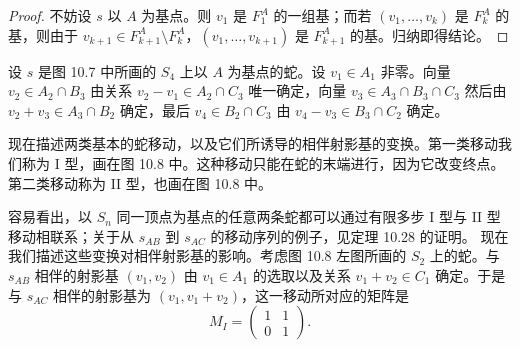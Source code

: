 \begin{proof}
不妨设 $s$ 以 $A$ 为基点。则 $v_1$ 是 $F^A_1$ 的一组基；而若 $(v_1,\dots,v_k)$ 是 $F^A_k$ 的基，则由于 $v_{k+1}\in F^A_{k+1}\setminus F^A_k$，$(v_1,\dots,v_{k+1})$ 是 $F^A_{k+1}$ 的基。归纳即得结论。
\end{proof}

\begin{example}[10.27] 设 $s$ 是图 10.7 中所画的 $S_4$ 上以 $A$ 为基点的蛇。设 $v_1\in A_1$ 非零。向量 $v_2\in A_2\cap B_3$ 由关系 $v_2-v_1\in A_2\cap C_3$ 唯一确定，向量 $v_3\in A_3\cap B_3\cap C_3$ 然后由 $v_2+v_3\in A_3\cap B_2$ 确定，最后 $v_4\in B_2\cap C_3$ 由 $v_4-v_3\in B_3\cap C_2$ 确定。
\end{example}


现在描述两类基本的蛇移动，以及它们所诱导的相伴射影基的变换。第一类移动我们称为 I 型，画在图 10.8 中。这种移动只能在蛇的末端进行，因为它改变终点。第二类移动称为 II 型，也画在图 10.8 中。


容易看出，以 $S_n$ 同一顶点为基点的任意两条蛇都可以通过有限多步 I 型与 II 型移动相联系；关于从 $s_{AB}$ 到 $s_{AC}$ 的移动序列的例子，见定理 10.28 的证明。
现在我们描述这些变换对相伴射影基的影响。考虑图 10.8 左图所画的 $S_2$ 上的蛇。与 $s_{AB}$ 相伴的射影基 $(v_1,v_2)$ 由 $v_1\in A_1$ 的选取以及关系 $v_1+v_2\in C_1$ 确定。于是与 $s_{AC}$ 相伴的射影基为 $(v_1,v_1+v_2)$，这一移动所对应的矩阵是
\[
M_I=\begin{pmatrix}1&1\\0&1\end{pmatrix}.
\]


